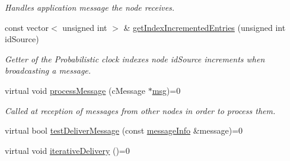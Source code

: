 \begin{DoxyCompactItemize}
\begin{DoxyCompactList}\small\item\em Handles application message the node receives. \end{DoxyCompactList}\item 
const vector$<$ unsigned int $>$ \& \hyperlink{class_node_with_control_acf1daba46cfa16eb2bd7cbd399c2624b}{get\+Index\+Incremented\+Entries} (unsigned int id\+Source)
\begin{DoxyCompactList}\small\item\em Getter of the Probabilistic clock indexes node id\+Source increments when broadcasting a message. \end{DoxyCompactList}\item 
virtual void \hyperlink{class_node_with_control_af532082fab76c38d8c50ca90e991f4c3}{process\+Message} (c\+Message $\ast$\hyperlink{_controller_8h_afa0f3b802fbc219228f7bb97996fa558}{msg})=0
\begin{DoxyCompactList}\small\item\em Called at reception of messages from other nodes in order to process them. \end{DoxyCompactList}\item 
virtual bool \hyperlink{class_node_with_control_a84df0beabbaed80e7da017d592480515}{test\+Deliver\+Message} (const \hyperlink{structures_8h_a7e7bdc1d2fff8a9436f2f352b2711ed6}{message\+Info} \&message)=0
\item 
virtual void \hyperlink{class_node_with_control_a4f78078272b90937e0746c797443b37d}{iterative\+Delivery} ()=0
\end{DoxyCompactItemize}
